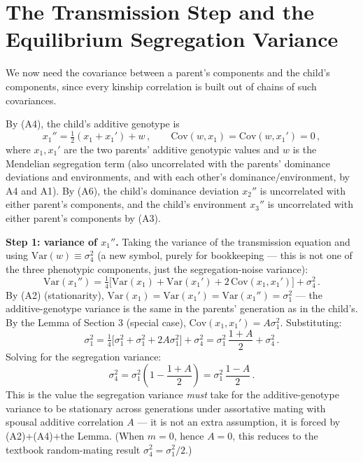 \documentclass[12pt]{article}
\begin{document}
\section{The Transmission Step and the Equilibrium Segregation Variance}

We now need the covariance between a parent's components and the child's components, since every kinship correlation is built out of chains of such covariances.

By (A4), the child's additive genotype is
\begin{equation}
x_1'' = \tfrac12(x_1+x_1') + w \, , \qquad \mathrm{Cov}(w,x_1)=\mathrm{Cov}(w,x_1')=0 \, ,
\end{equation}
where $x_1,x_1'$ are the two parents' additive genotypic values and $w$ is the Mendelian segregation term (also uncorrelated with the parents' dominance deviations and environments, and with each other's dominance/environment, by A4 and A1). By (A6), the child's dominance deviation $x_2''$ is uncorrelated with either parent's components, and the child's environment $x_3''$ is uncorrelated with either parent's components by (A3).

\textbf{Step 1: variance of $x_1''$.} Taking the variance of the transmission equation and using $\mathrm{Var}(w)\equiv\sigma_4^2$ (a new symbol, purely for bookkeeping — this is not one of the three phenotypic components, just the segregation-noise variance):
\begin{equation}
\mathrm{Var}(x_1'') = \tfrac14\big[\mathrm{Var}(x_1)+\mathrm{Var}(x_1')+2\,\mathrm{Cov}(x_1,x_1')\big] + \sigma_4^2 \, .
\end{equation}
By (A2) (stationarity), $\mathrm{Var}(x_1)=\mathrm{Var}(x_1')=\mathrm{Var}(x_1'')=\sigma_1^2$ — the additive-genotype variance is the same in the parents' generation as in the child's. By the Lemma of Section 3 (special case), $\mathrm{Cov}(x_1,x_1')=A\sigma_1^2$. Substituting:
\begin{equation}
\sigma_1^2 = \tfrac14\big[\sigma_1^2+\sigma_1^2+2A\sigma_1^2\big] + \sigma_4^2 = \sigma_1^2\,\frac{1+A}{2} + \sigma_4^2 \, .
\end{equation}
Solving for the segregation variance:
\begin{equation}
\sigma_4^2 = \sigma_1^2\left(1-\frac{1+A}{2}\right) = \sigma_1^2\,\frac{1-A}{2} \, . \tag{4.1}
\end{equation}
This is the value the segregation variance \emph{must} take for the additive-genotype variance to be stationary across generations under assortative mating with spousal additive correlation $A$ — it is not an extra assumption, it is forced by (A2)+(A4)+the Lemma. (When $m=0$, hence $A=0$, this reduces to the textbook random-mating result $\sigma_4^2=\sigma_1^2/2$.)
\end{document}
